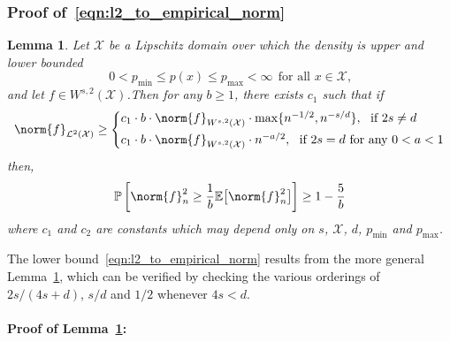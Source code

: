 \documentclass{article}
\newcommand{\1}{\mathbf{1}}
\newcommand{\Xset}{\mathcal{X}}
\newcommand{\Leb}{\mathcal{L}}
\newcommand{\Ebb}{\mathbb{E}}
\theoremstyle{alden}
\theoremstyle{aldenthm}
\newtheorem{lemma}{Lemma}
\theoremstyle{definition}
\theoremstyle{remark}
\begin{document}
\subsubsection{Proof of~\eqref{eqn:l2_to_empirical_norm}}

\begin{lemma}
	\label{lem:empirical_norm_sobolev}
	Let $\Xset$ be a Lipschitz domain over which the density is upper and lower bounded 
	\begin{equation*}
	0 < p_{\min} \leq p(x) \leq p_{\max} < \infty ~~\textrm{for all $x \in \Xset$,}
	\end{equation*}
	and let $f \in W^{s,2}(\Xset)$.Then for any $b \geq 1$, there exists $c_1$ such that if 
	\begin{equation}
	\norm{f}_{\Leb^2(\Xset)} \geq 
	\begin{cases*}
	c_1 \cdot b \cdot \norm{f}_{W^{s,2}(\Xset)} \cdot \max\{n^{-1/2},n^{-s/d}\},~~\textrm{if}~2s \neq d \\
	c_1 \cdot b \cdot \norm{f}_{W^{s,2}(\Xset)} \cdot n^{-a/2},~~\textrm{if}~ 2s = d ~\textrm{for any}~ 0 < a < 1
	\end{cases*}
	\end{equation}
	then,
	\begin{equation}
	\label{eqn:l2_to_empirical_norm_sobolev}
	\mathbb{P}\left[\norm{f}_n^2 \geq \frac{1}{b} \Ebb\bigl[\norm{f}_n^2\bigr]\right] \geq 1 - \frac{5}{b}
	\end{equation}
	where $c_1$ and $c_2$ are constants which may depend only on $s$, $\Xset$, $d$, $p_{\min}$ and $p_{\max}$.
\end{lemma}
The lower bound~\eqref{eqn:l2_to_empirical_norm} results from the more general Lemma~\ref{lem:empirical_norm_sobolev}, which can be verified by checking the various orderings of $2s/(4s + d)$, $s/d$ and $1/2$ whenever $4s < d$. 

\paragraph{Proof of Lemma~\ref{lem:empirical_norm_sobolev}:}
\end{document}
